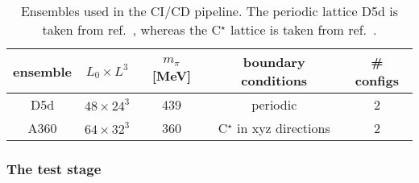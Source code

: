 \begin{table}[t]
  \centering
  \begin{tabular}{ccccc}
    \toprule
    {ensemble}&
    {$L_0 \times L^3$}&
    {$m_{\pi}$ [MeV]}&
    {boundary conditions}&
    {\# configs} \\
    \midrule
    D5d  & $48 \times 24^3$ & 439 & periodic    & 2 \\
    A360 & $64 \times 32^3$ & 360 & C$^{\star}$ in xyz directions & 2 \\
    \bottomrule
  \end{tabular}
  \caption{\label{tab:cicd:ensembles}%
    Ensembles used in the CI/CD pipeline. The periodic lattice D5d is taken from ref.~\cite{online:cls}, whereas the C$^{\star}$ lattice is taken from ref.~\cite{RCstar22}.}
\end{table}

\subsubsection{The test stage}
\label{sec:cicd:pipeline:gitlab:test}

